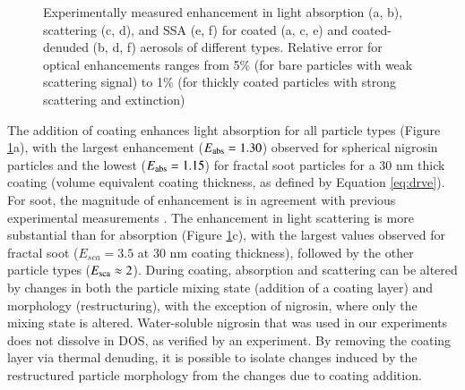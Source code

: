 \begin{figure}[htp]
{
    }
    \caption{Experimentally measured enhancement in light absorption (a, b), scattering (c, d), and SSA (e, f) for coated (a, c, e) and coated-denuded (b, d, f) aerosols of different types. Relative error for optical enhancements ranges from 5\% (for bare particles with weak scattering signal) to 1\% (for thickly coated particles with strong scattering and extinction)}
    \label{fig:opt_data}
\end{figure}



The addition of coating enhances light absorption for all particle types (Figure \ref{fig:opt_data}a), with the largest enhancement ($E_{\rm abs}=1.30$) observed for spherical nigrosin particles and the lowest ($E_{\rm abs}=1.15$) for fractal soot particles for a 30 nm thick coating (volume equivalent coating thickness, as defined by Equation \ref{eq:drve}). For soot, the magnitude of enhancement is in agreement with previous experimental measurements \citep{RN41,RN7}. The enhancement in light scattering is more substantial than for absorption (Figure \ref{fig:opt_data}c), with the largest values observed for fractal soot ($E_{sca} = 3.5$ at 30 nm coating thickness), followed by the other particle types ($E_{\rm sca} \approx 2$). During coating, absorption and scattering can be altered by changes in both the particle mixing state (addition of a coating layer) and morphology (restructuring), with the exception of nigrosin, where only the mixing state is altered. Water-soluble nigrosin that was used in our experiments does not dissolve in DOS, as verified by an experiment. By removing the coating layer via thermal denuding, it is possible to isolate changes induced by the restructured particle morphology from the changes due to coating addition.

